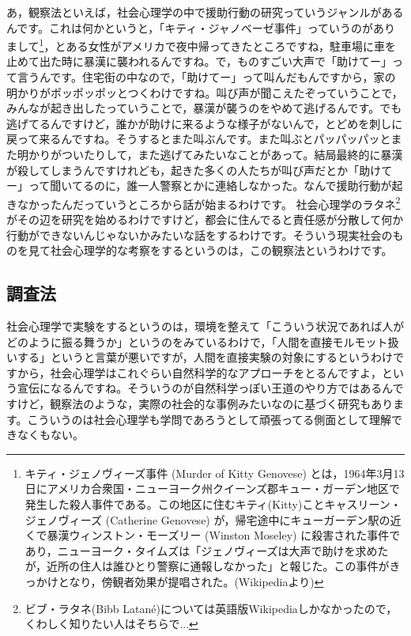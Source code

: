 \documentclass{ltjsbook}
\begin{document}
あ，観察法といえば，社会心理学の中で援助行動の研究っていうジャンルがあるんです。これは何かというと，「キティ・ジャノベーゼ事件」っていうのがありまして\footnote{キティ・ジェノヴィーズ事件 (Murder of Kitty Genovese) とは，1964年3月13日にアメリカ合衆国・ニューヨーク州クイーンズ郡キュー・ガーデン地区で発生した殺人事件である。この地区に住むキティ(Kitty)ことキャスリーン・ジェノヴィーズ (Catherine Genovese) が，帰宅途中にキューガーデン駅の近くで暴漢ウィンストン・モーズリー (Winston Moseley) に殺害された事件であり，ニューヨーク・タイムズは「ジェノヴィーズは大声で助けを求めたが，近所の住人は誰ひとり警察に通報しなかった」と報じた。この事件がきっかけとなり，傍観者効果が提唱された。(Wikipediaより)}，とある女性がアメリカで夜中帰ってきたところですね，駐車場に車を止めて出た時に暴漢に襲われるんですね。で，ものすごい大声で「助けてー」って言うんです。住宅街の中なので，「助けてー」って叫んだもんですから，家の明かりがポッポッポッとつくわけですね。叫び声が聞こえたぞっていうことで，みんなが起き出したっていうことで，暴漢が襲うのをやめて逃げるんです。でも逃げてるんですけど，誰かが助けに来るような様子がないんで，とどめを刺しに戻って来るんですね。そうするとまた叫ぶんです。また叫ぶとパッパッパッとまた明かりがついたりして，また逃げてみたいなことがあって。結局最終的に暴漢が殺してしまうんですけれども，起きた多くの人たちが叫び声だとか「助けてー」って聞いてるのに，誰一人警察とかに連絡しなかった。なんで援助行動が起きなかったんだっていうところから話が始まるわけです。
社会心理学のラタネ\footnote{ビブ・ラタネ(Bibb Latan\'e)については英語版Wikipediaしかなかったので，くわしく知りたい人はそちらで...}がその辺を研究を始めるわけですけど，都会に住んでると責任感が分散して何か行動ができないんじゃないかみたいな話をするわけです。そういう現実社会のものを見て社会心理学的な考察をするというのは，この観察法というわけです。

\subsection{調査法}
社会心理学で実験をするというのは，環境を整えて「こういう状況であれば人がどのように振る舞うか」というのをみているわけで，「人間を直接モルモット扱いする」というと言葉が悪いですが，人間を直接実験の対象にするというわけですから，社会心理学はこれぐらい自然科学的なアプローチをとるんですよ，という宣伝になるんですね。そういうのが自然科学っぽい王道のやり方ではあるんですけど，観察法のような，実際の社会的な事例みたいなのに基づく研究もあります。こういうのは社会心理学も学問であろうとして頑張ってる側面として理解できなくもない。
\end{document}
